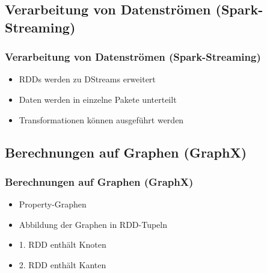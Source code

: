 \documentclass[hyperref={pdfpagelabels=false}]{beamer}
\begin{document}
\subsection{Verarbeitung von Datenströmen (Spark-Streaming)}
\begin{frame} [t]
\frametitle{Verarbeitung von Datenströmen (Spark-Streaming)}

\begin{itemize}
	\item RDDs werden zu DStreams erweitert
	\item Daten werden in einzelne Pakete unterteilt
	\item Transformationen können ausgeführt werden
\end{itemize}

 {
	\begin{figure}[h]
		\centering
	\end{figure}
}
\end{frame}


\subsection{Berechnungen auf Graphen (GraphX)}
\begin{frame} [t]
\frametitle{Berechnungen auf Graphen (GraphX)}

\begin{itemize}
	\item Property-Graphen
	\item Abbildung der Graphen in RDD-Tupeln
	\item 1. RDD enthält Knoten
	\item 2. RDD enthält Kanten	
\end{itemize}

 {
	\begin{figure}[h]
		\centering
	\end{figure}
}

\end{frame}
\end{document}

